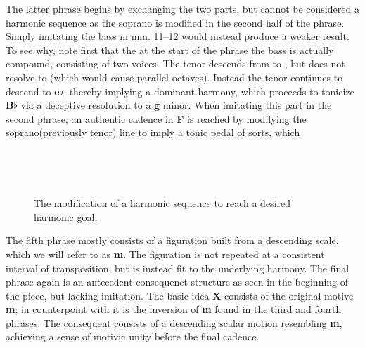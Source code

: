 \begin{example}[\bwv{935}]
The latter phrase begins by exchanging the two parts, but cannot be considered a harmonic sequence as the soprano is modified in the second half of the phrase. Simply imitating the bass in mm. 11--12 would instead produce a weaker result. To see why, note first that the at the start of the phrase the bass is actually compound, consisting of two voices. The tenor descends from  to , but does not resolve to (which would cause parallel octaves). Instead the tenor continues to descend to \textbf{e}$\flat$, thereby implying a dominant harmony, which proceeds to tonicize \textbf{B}$\flat$ via a deceptive resolution to a \textbf{g} minor. When imitating this part in the second phrase, an authentic cadence in \textbf{F} is reached by modifying the soprano(previously tenor) line to imply a tonic pedal of sorts, which
\begin{figure}[h]
\centering
\begin{minipage}[b]{.45\textwidth}
\,\raisebox{13pt}{.}
\vspace{1pt}
\end{minipage}
\begin{minipage}[b]{.45\textwidth}
\,\raisebox{9.5pt}{.}
\vspace{3pt}
\end{minipage}
\caption{The modification of a harmonic sequence to reach a desired harmonic goal. }
\end{figure}

The fifth phrase mostly consists of a figuration built from a descending scale, which we will refer to as \textbf{m}. The figuration is not repeated at a consistent interval of transposition, but is instead fit to the underlying harmony. The final phrase again is an antecedent-consequenct structure as seen in the beginning of the piece, but lacking imitation. The basic idea \textbf{X} consists of the original motive \textbf{m}; in counterpoint with it is the inversion of \textbf{m} found in the third and fourth phrases. The consequent consists of a descending scalar motion resembling \textbf{m}, achieving a sense of motivic unity before the final cadence.

\end{example}
